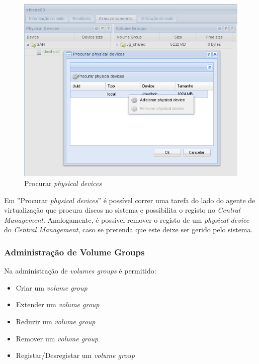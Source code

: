 \begin{figure}[H]
        \begin{center}
        \includegraphics[scale=0.45]{screenshots/node_storage_device_search.png}
        \caption{Procurar \emph{physical devices} }
        \label{fig:storage_device_search}
        \end{center}
\end{figure}

Em ''Procurar \emph{physical devices}'' é possível correr uma tarefa do lado do agente de virtualização que procura discos no sistema e possibilita o registo no \emph{Central Management}.
Analogamente, é possível remover o registo de um \emph{physical device} do \emph{Central Management}, caso se pretenda que este deixe ser gerido pelo sistema.


\subsubsection{Administração de Volume Groups}
Na administração de \emph{volumes groups} é permitido:
\begin{itemize}
	\item Criar um \emph{volume group}
	\item Extender um \emph{volume group}
	\item Reduzir um \emph{volume group}
	\item Remover um \emph{volume group}
    \item Registar/Desregistar um \emph{volume group}
\end{itemize}

